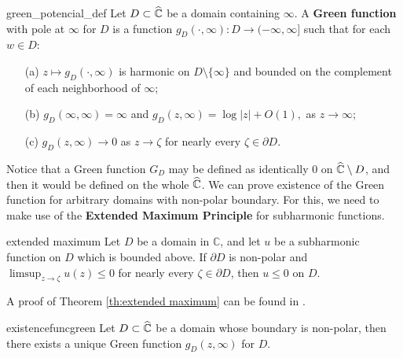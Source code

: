 \begin{mydef}{}{green_potencial_def}
Let $D\subset \widehat{\mathbb{C}}$ be a domain containing $\infty$. A {\bf Green function} with pole at $\infty$ for $D$ is a function $g_D(\cdot,\infty):D \rightarrow (-\infty,\infty]$ such that for each $w \in D$:
\begin{itemize}
\item[(a)] $z\mapsto g_D(\cdot,\infty)$ is harmonic on $D\setminus \{\infty\}$ and bounded on the complement of each neighborhood of $\infty$;\\
\item[(b)] $g_D(\infty,\infty) = \infty$ and
$g_D(z,\infty) = \log|z|+O(1),$
as $z\rightarrow \infty$;\\
\item[(c)] $g_D(z,\infty) \rightarrow 0$ as $z \rightarrow \zeta$  for nearly every $\zeta\in \partial D$. 
\end{itemize} 
\end{mydef}

Notice that a Green function $G_D$ may be defined as identically $0$ on $\widehat{\mathbb{C}}\setminus D$, and then it would be defined on the whole $\widehat{\mathbb{C}}$. We can prove existence of the Green function for arbitrary domains with non-polar boundary. For this, we need to make use of the {\bf Extended Maximum Principle} for subharmonic functions. 

\begin{mytheo}{}{extended maximum}
Let $D$ be a domain in $\mathbb{C}$, and let $u$ be a subharmonic function on $D$ which is bounded above. If $\partial D$ is non-polar and $\limsup_{z\rightarrow \zeta} u(z)\leq 0$ for nearly every $\zeta \in \partial D$, then $u\leq 0$ on $D$. 
\end{mytheo}

A proof of Theorem \ref{th:extended maximum} can be found in \cite[Theorem 3.6.9]{ransford}.\\

\begin{mytheo}{}{existencefuncgreen}
Let $D\subset \widehat{\mathbb{C}}$ be a domain whose boundary is non-polar, then there exists a unique Green function $g_D(z,\infty)$ for $D$.
\end{mytheo}

